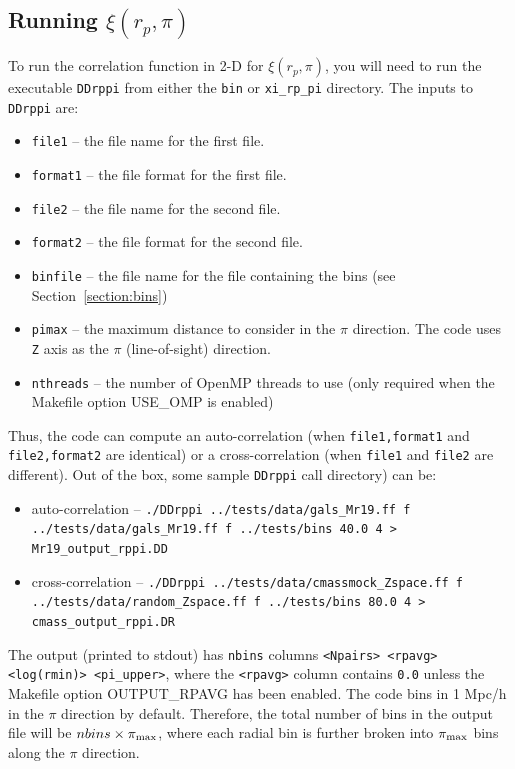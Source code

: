 \documentclass[12pt,titlepage]{article}
\newcommand{\xirppi}{\ensuremath{{\xi(r_p,\pi)}}\xspace}
\begin{document}
\subsection{Running \texorpdfstring{\xirppi}{xi(rp,pi)}}
To run the correlation function in 2-D for \xirppi, you will need to run the executable \texttt{DDrppi} from either the \texttt{bin} or \texttt{xi\_rp\_pi} directory. The inputs 
to \texttt{DDrppi} are:
\begin{itemize}
\item \texttt{file1}   -- the file name for the first file.
\item \texttt{format1} -- the file format for the first file.
\item \texttt{file2}   -- the file name for the second file.
\item \texttt{format2} -- the file format for the second file.
\item \texttt{binfile} -- the file name for the file containing the bins (see Section~\ref{section:bins})
\item \texttt{pimax}   -- the maximum distance to consider in the $\pi$ direction. The code uses \texttt{Z} axis as the $\pi$ (line-of-sight) direction. 
\item \texttt{nthreads} -- the number of OpenMP threads to use (only required when the Makefile option USE\_OMP is enabled)
\end{itemize}
Thus, the code can compute an auto-correlation (when \texttt{file1,format1} and \texttt{file2,format2} are identical) or a cross-correlation (when \texttt{file1} and \texttt{file2} are different). Out of the box, 
some sample \texttt{DDrppi} call directory) can be:
\begin{itemize}
\item auto-correlation --  {\scriptsize \texttt{./DDrppi  ../tests/data/gals\_Mr19.ff f ../tests/data/gals\_Mr19.ff f ../tests/bins 40.0 4 > Mr19\_output\_rppi.DD}}
\item cross-correlation -- {\scriptsize \texttt{./DDrppi ../tests/data/cmassmock\_Zspace.ff f ../tests/data/random\_Zspace.ff f ../tests/bins 80.0 4 > cmass\_output\_rppi.DR}}
\end{itemize}
The output (printed to stdout) has \texttt{nbins} columns \texttt{<Npairs> <rpavg> <log(rmin)> <pi\_upper>}, where the \texttt{<rpavg>} column contains \texttt{0.0} unless the 
Makefile option OUTPUT\_RPAVG has been enabled. The code bins in 1 Mpc/h in the $\pi$ direction by default. Therefore, 
the total number of bins in the output file will be $nbins \times \pi_{\rm max}$, where each radial bin is further broken into $\pi_{\rm max}$ bins along the 
$\pi$ direction. 
\end{document}
